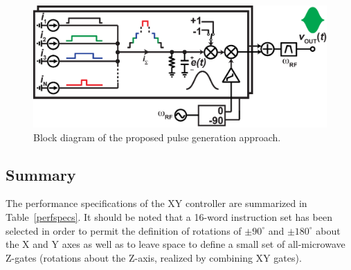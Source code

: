 \documentclass[journal]{IEEEtran}
\newcommand{\CR}[1]{{\color{black}#1}}
\begin{document}
\begin{figure}[bt!]
\begin{center}
\includegraphics[width=\columnwidth]{Figures/FIGURE_7}
\end{center}
\caption{Block diagram of the proposed pulse generation approach.}
\label{Concept}
\end{figure}






\subsection{Summary}
The performance specifications of the XY controller are summarized in Table~\ref{perfspecs}. \CR{It should be noted that a 16-word instruction set has been selected in order to permit the definition of rotations of $\pm{}90^\circ$ and $\pm{}180^\circ$ about the X and Y axes as well as to leave space to define a small set of all-microwave Z-gates (rotations about the Z-axis, realized by combining XY gates)}. 

\end{document}
